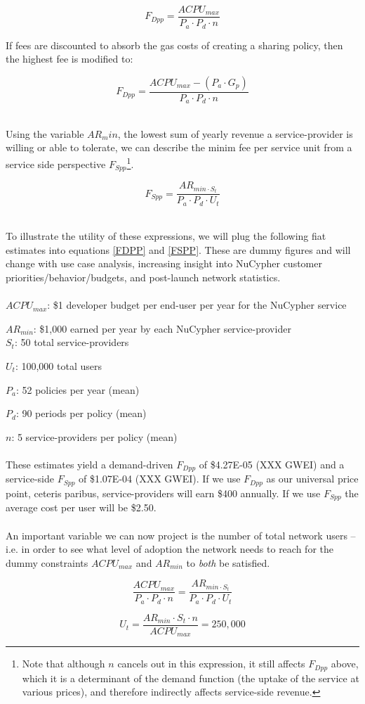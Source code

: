 \documentclass[longbibliography,nofootinbib]{revtex4-1}
\begin{document}
\begin{equation}
\label{FDPP}
    F_{Dpp} = \frac{ACPU_{max}}{P_a \cdot P_d \cdot n}
\end{equation}

If fees are discounted to absorb the gas costs of creating a sharing policy, then the highest fee is modified to: 

\begin{equation}
    F_{Dpp} = \frac{ACPU_{max} - (P_a \cdot G_p)}{P_a \cdot P_d \cdot n}
\end{equation} \

Using the variable $AR_min$, the lowest sum of yearly revenue a service-provider is willing or able to tolerate, we can describe the minim fee per service unit from a service side perspective $F_{Spp}$\footnote{Note that although $n$ cancels out in this expression, it still affects $F_{Dpp}$ above, which it is a determinant of the demand function (the uptake of the service at various prices), and therefore indirectly affects service-side revenue.}.

\begin{equation}
\label{FSPP}
    F_{Spp} = \frac{AR_{min \cdot S_t}}{P_a \cdot P_d \cdot U_t}
\end{equation} \ 

To illustrate the utility of these expressions, we will plug the following fiat estimates into equations \ref{FDPP} and \ref{FSPP}. These are dummy figures and will change with  use case analysis, increasing insight into NuCypher customer priorities/behavior/budgets, and post-launch network statistics.
\\\\

$ACPU_{max}$: \$1 developer budget per end-user per year for the NuCypher service

$AR_{min}$: \$1,000 earned per year by each NuCypher service-provider
\\

$S_t$: 50 total service-providers

$U_t$: 100,000 total users

$P_a$: 52 policies per year (mean)

$P_d$: 90 periods per policy (mean)

$n$: 5 service-providers per policy (mean)
\\\\
These estimates yield a demand-driven $F_{Dpp}$ of \$4.27E-05 (XXX GWEI) and a service-side $F_{Spp}$ of \$1.07E-04 (XXX GWEI). If we use $F_{Dpp}$ as our universal price point, ceteris paribus, service-providers will earn \$400 annually. If we use $F_{Spp}$ the average cost per user will be \$2.50. 
\\\\
An important variable we can now project is the number of total network users – i.e. in order to see what level of adoption the network needs to reach for the dummy constraints $ACPU_{max}$ and $AR_{min}$ to \textit{both} be satisfied.

\begin{equation}
     \frac{ACPU_{max}}{P_a \cdot P_d \cdot n} = \frac{AR_{min \cdot S_t}}{P_a \cdot P_d \cdot U_t}
\end{equation}

\begin{equation}
     U_t = \frac{AR_{min} \cdot S_t \cdot n}{ACPU_{max}} = 250,000 
\end{equation}


\end{document}
